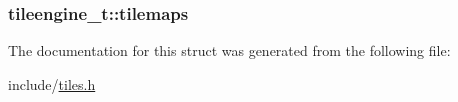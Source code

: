 \subsubsection[{\texorpdfstring{tilemaps}{tilemaps}}]{ tileengine\+\_\+t\+::tilemaps}\hypertarget{structtileengine__t_ab5bfc8e174c326d26fb236c238730c1f}{}\label{structtileengine__t_ab5bfc8e174c326d26fb236c238730c1f}


The documentation for this struct was generated from the following file\+:\begin{DoxyCompactItemize}
\item 
include/\hyperlink{tiles_8h}{tiles.\+h}\end{DoxyCompactItemize}
